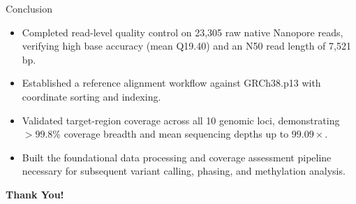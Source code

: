 \documentclass[aspectratio=169, 10pt]{beamer}
\begin{document}
\begin{frame}{Conclusion}
    \vspace{0.4cm}
    \begin{itemize}
        \item Completed read-level quality control on 23,305 raw native Nanopore reads, verifying high base accuracy (mean Q19.40) and an N50 read length of 7,521 bp.
        \item Established a reference alignment workflow against GRCh38.p13 with coordinate sorting and indexing.
        \item Validated target-region coverage across all 10 genomic loci, demonstrating $>99.8\%$ coverage breadth and mean sequencing depths up to $99.09\times$.
        \item Built the foundational data processing and coverage assessment pipeline necessary for subsequent variant calling, phasing, and methylation analysis.
    \end{itemize}
\end{frame}

\begin{frame}[plain]
    \begin{center}
        \vspace{2.2cm}
        \Huge \textbf{\textcolor{primaryBlue}{Thank You!}} \\[0.6cm]
    \end{center}
\end{frame}
\end{document}
